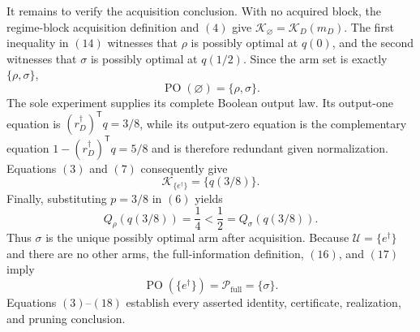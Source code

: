 It remains to verify the acquisition conclusion.  With no acquired block, the regime-block acquisition definition and \((4)\) give \(\mathcal K_\varnothing=\mathcal K_D(m_D)\).  The first inequality in \((14)\) witnesses that \(\rho\) is possibly optimal at \(q(0)\), and the second witnesses that \(\sigma\) is possibly optimal at \(q(1/2)\).  Since the arm set is exactly \(\{\rho,\sigma\}\),
\[
\operatorname{PO}(\varnothing)=\{\rho,\sigma\}.
\tag{15}
\]
The sole experiment supplies its complete Boolean output law.  Its output-one equation is \((r_D^\dagger)^{\mathsf T}q=3/8\), while its output-zero equation is the complementary equation \(1-(r_D^\dagger)^{\mathsf T}q=5/8\) and is therefore redundant given normalization.  Equations \((3)\) and \((7)\) consequently give
\[
\mathcal K_{\{e^\dagger\}}=\{q(3/8)\}.
\tag{16}
\]
Finally, substituting \(p=3/8\) in \((6)\) yields
\[
Q_\rho(q(3/8))=\frac14
<\frac12=Q_\sigma(q(3/8)).
\tag{17}
\]
Thus \(\sigma\) is the unique possibly optimal arm after acquisition.  Because \(\mathcal U=\{e^\dagger\}\) and there are no other arms, the full-information definition, \((16)\), and \((17)\) imply
\[
\operatorname{PO}(\{e^\dagger\})
=\mathcal P_{\mathrm{full}}
=\{\sigma\}.
\tag{18}
\]
Equations \((3)\)--\((18)\) establish every asserted identity, certificate, realization, and pruning conclusion.